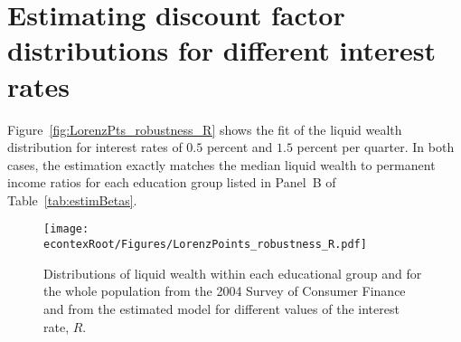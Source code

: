 \documentclass[\econtexRoot/HAFiscal]{subfiles}
\begin{document}

\hypertarget{Appendices}{} %

\section{Estimating discount factor distributions for different interest rates}
\notinsubfile{\label{app:DF_R}}

Figure~\ref{fig:LorenzPts_robustness_R} shows the fit of the liquid wealth distribution for interest rates of $0.5$ percent and $1.5$ percent per quarter. In both cases, the estimation exactly matches the median liquid wealth to permanent income ratios for each education group listed in Panel~B of Table~\ref{tab:estimBetas}. 


\begin{figure}[th]
  \begin{center}
    \texttt{[image: \\econtexRoot/Figures/LorenzPoints\_robustness\_R.pdf]}
    \caption{Distributions of liquid wealth within each educational group and for the whole population from the 2004 Survey of Consumer Finance and from the estimated model for different values of the interest rate, $R$.}
    \notinsubfile{\label{fig:LorenzPts_robustness_R}}
  \end{center}
\end{figure}
\end{document}
